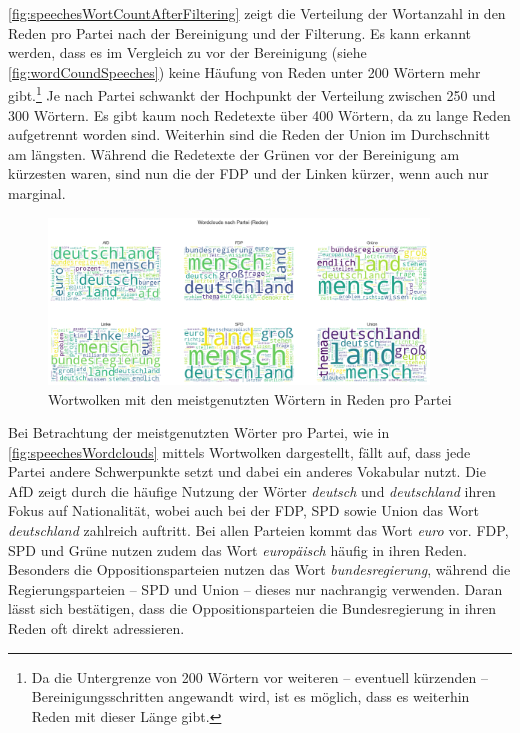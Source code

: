 \autoref{fig:speechesWortCountAfterFiltering} zeigt die Verteilung der Wortanzahl in den Reden pro Partei nach der Bereinigung und der Filterung. Es kann erkannt werden, dass es im Vergleich zu vor der Bereinigung (siehe \autoref{fig:wordCoundSpeeches}) keine Häufung von Reden unter \num{200} Wörtern mehr gibt.\footnote{Da die Untergrenze von \num{200} Wörtern vor weiteren -- eventuell kürzenden -- Bereinigungsschritten angewandt wird, ist es möglich, dass es weiterhin Reden mit dieser Länge gibt.} Je nach Partei schwankt der Hochpunkt der Verteilung zwischen \num{250} und \num{300} Wörtern. Es gibt kaum noch Redetexte über \num{400} Wörtern, da zu lange Reden aufgetrennt worden sind. Weiterhin sind die Reden der Union im Durchschnitt am längsten. Während die Redetexte der Grünen vor der Bereinigung am kürzesten waren, sind nun die der \ac{FDP} und der Linken kürzer, wenn auch nur marginal.

\begin{figure}[H]
    \centering
    \includegraphics[width=0.9\textwidth]{data/images/speeches/speeches_wordclouds.png}
    \caption{Wortwolken mit den meistgenutzten Wörtern in Reden pro Partei} \label{fig:speechesWordclouds}
\end{figure}

Bei Betrachtung der meistgenutzten Wörter pro Partei, wie in \autoref{fig:speechesWordclouds} mittels Wortwolken dargestellt, fällt auf, dass jede Partei andere Schwerpunkte setzt und dabei ein anderes Vokabular nutzt. Die \ac{AfD} zeigt durch die häufige Nutzung der Wörter \textit{deutsch} und \textit{deutschland} ihren Fokus auf Nationalität, wobei auch bei der \ac{FDP}, \ac{SPD} sowie Union das Wort \textit{deutschland} zahlreich auftritt. Bei allen Parteien kommt das Wort \textit{euro} vor. \ac{FDP}, \ac{SPD} und Grüne nutzen zudem das Wort \textit{europäisch} häufig in ihren Reden. Besonders die Oppositionsparteien nutzen das Wort \textit{bundesregierung}, während die Regierungsparteien -- \ac{SPD} und Union -- dieses nur nachrangig verwenden. Daran lässt sich bestätigen, dass die Oppositionsparteien die Bundesregierung in ihren Reden oft direkt adressieren.

